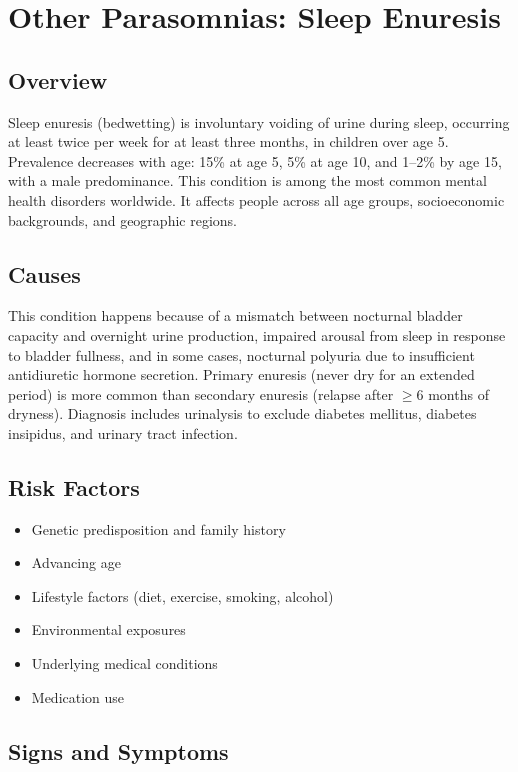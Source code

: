 \chapter{Other Parasomnias: Sleep Enuresis}
\label{sec:Sleep Enuresis}

\section{Overview}
Sleep enuresis (bedwetting) is involuntary voiding of urine during sleep, occurring at least twice per week for at least three months, in children over age 5. Prevalence decreases with age: 15\% at age 5, 5\% at age 10, and 1--2\% by age 15, with a male predominance. This condition is among the most common mental health disorders worldwide. It affects people across all age groups, socioeconomic backgrounds, and geographic regions.
\section{Causes}
This condition happens because of a mismatch between nocturnal bladder capacity and overnight urine production, impaired arousal from sleep in response to bladder fullness, and in some cases, nocturnal polyuria due to insufficient antidiuretic hormone secretion. Primary enuresis (never dry for an extended period) is more common than secondary enuresis (relapse after $\ge$6 months of dryness). Diagnosis includes urinalysis to exclude diabetes mellitus, diabetes insipidus, and urinary tract infection.     
\section{Risk Factors}

\begin{itemize}[noitemsep]
  \item Genetic predisposition and family history
  \item Advancing age
  \item Lifestyle factors (diet, exercise, smoking, alcohol)
  \item Environmental exposures
  \item Underlying medical conditions
  \item Medication use
\end{itemize}
\section{Signs and Symptoms}


